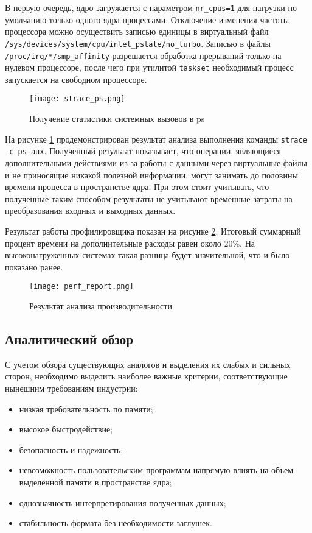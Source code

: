В первую очередь, ядро загружается с параметром \texttt{nr\_cpus=1} для нагрузки
по умолчанию только одного ядра процессами\cite{kernel_docs}.
Отключение изменения частоты процессора можно осуществить записью единицы в
виртуальный файл
\texttt{/sys/devices/system/cpu/intel\_pstate/no\_turbo}. Записью в файлы
\texttt{/proc/irq/*/smp\_affinity} разрешается обработка прерываний только на
нулевом процессоре, после чего при утилитой \texttt{taskset} необходимый
процесс запускается на свободном процессоре.

\begin{figure}
  \centering
  \texttt{[image: strace\_ps.png]}
  \caption{Получение статистики системных вызовов в ps}
  \label{fig:strace_ps}
\end{figure}

На рисунке \ref{fig:strace_ps}
продемонстрирован результат анализа выполнения команды
\texttt{strace -c ps aux}. Полученный результат
показывает, что операции, являющиеся дополнительными действиями из-за работы с
данными через виртуальные файлы и не приносящие никакой полезной информации,
могут занимать до половины времени процесса в пространстве ядра. При этом стоит
учитывать, что полученные таким способом результаты не учитывают временные
затраты на преобразования входных и выходных данных. 

Результат работы профилировщика показан на рисунке \ref{fig:perf_report}.
Итоговый суммарный процент времени на дополнительные расходы равен около 20\%.
На высоконагруженных системах такая разница будет значительной, что и было
показано ранее.

\begin{figure}
  \centering
  \texttt{[image: perf\_report.png]}
  \caption{Результат анализа производительности}
  \label{fig:perf_report}
\end{figure}

\subsection{Аналитический обзор}
\label{sub:domain:analitic_overview}

С учетом обзора существующих аналогов и выделения их слабых и сильных сторон,
необходимо выделить наиболее важные критерии, соответствующие нынешним
требованиям индустрии:

\begin{itemize}
\item низкая требовательность по памяти;
\item высокое быстродействие;
\item безопасность и надежность;
\item невозможность пользовательским программам напрямую влиять на объем
  выделенной памяти в пространстве ядра;
\item однозначность интерпретирования полученных данных;
\item стабильность формата без необходимости заглушек.
\end{itemize}

